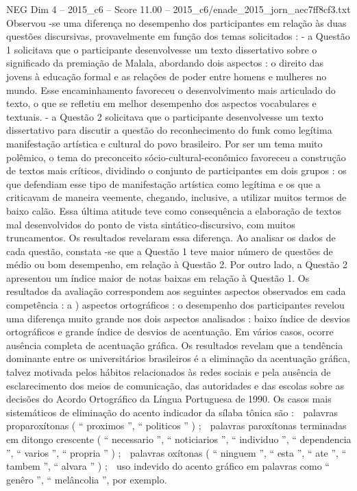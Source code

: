 \begin{textsample}{NEG Dim 4 – 2015\_c6 – Score 11.00 – 2015\_c6/enade\_2015\_jorn\_aec7ff8cf3.txt}
Observou -se uma diferença no desempenho dos participantes em relação às duas questões discursivas, provavelmente em função dos temas solicitados : - a Questão 1 solicitava que o participante desenvolvesse um texto dissertativo sobre o significado da premiação de Malala, abordando dois aspectos : o direito das jovens à educação formal e as relações de poder entre homens e mulheres no mundo.
Esse encaminhamento favoreceu o desenvolvimento mais articulado do texto, o que se refletiu em melhor desempenho dos aspectos vocabulares e textuais. - a Questão 2 solicitava que o participante desenvolvesse um texto dissertativo para discutir a questão do reconhecimento do funk como legítima manifestação artística e cultural do povo brasileiro.
Por ser um tema muito polêmico, o tema do preconceito sócio-cultural-econômico favoreceu a construção de textos mais críticos, dividindo o conjunto de participantes em dois grupos : os que defendiam esse tipo de manifestação artística como legítima e os que a criticavam de maneira veemente, chegando, inclusive, a utilizar muitos termos de baixo calão.
Essa última atitude teve como consequência a elaboração de textos mal desenvolvidos do ponto de vista sintático-discursivo, com muitos truncamentos.
Os resultados revelaram essa diferença.
Ao analisar os dados de cada questão, constata -se que a Questão 1 teve maior número de questões de médio ou bom desempenho, em relação à Questão 2.
Por outro lado, a Questão 2 apresentou um índice maior de notas baixas em relação à Questão 1.
Os resultados da avaliação correspondem aos seguintes aspectos observados em cada competência : a ) aspectos ortográficos : o desempenho dos participantes revelou uma diferença muito grande nos dois aspectos analisados : baixo índice de desvios ortográficos e grande índice de desvios de acentuação.
Em vários casos, ocorre ausência completa de acentuação gráfica.
Os resultados revelam que a tendência dominante entre os universitários brasileiros é a eliminação da acentuação gráfica, talvez motivada pelos hábitos relacionados às redes sociais e pela ausência de esclarecimento dos meios de comunicação, das autoridades e das escolas sobre as decisões do Acordo Ortográfico da Língua Portuguesa de 1990.
Os casos mais sistemáticos de eliminação do acento indicador da sílaba tônica são :  palavras proparoxítonas ( “ proximos ”, “ politicos ” ) ;  palavras paroxítonas terminadas em ditongo crescente ( “ necessario ”, “ noticiarios ”, “ individuo ”, “ dependencia ”, “ varios ”, “ propria ” ) ;  palavras oxítonas ( “ ninguem ”, “ esta ”, “ ate ”, “ tambem ”, “ alvara ” ) ;  uso indevido do acento gráfico em palavras como “ genêro ”, “ melâncolia ”, por exemplo.

\end{textsample}
